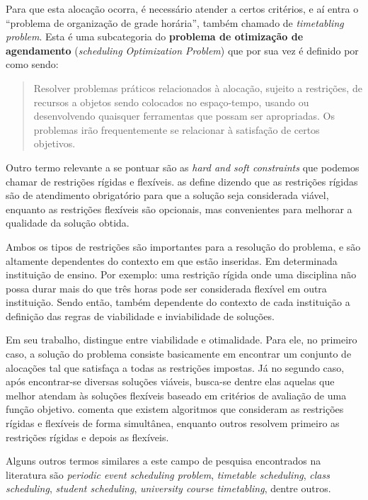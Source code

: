 Para que esta alocação ocorra, é necessário atender a certos critérios, e aí entra o ``problema de organização de grade horária'', também chamado de \textit{timetabling problem}. Esta é uma subcategoria do \textbf{problema de otimização de agendamento} (\textit{scheduling Optimization Problem}) \cite{Alencar2019} que por sua vez é definido por  como sendo:

\begin{quote}\footnotesize
  Resolver problemas práticos relacionados à alocação, sujeito a restrições, de recursos a objetos sendo colocados no espaço-tempo, usando ou desenvolvendo quaisquer ferramentas que possam ser apropriadas. Os problemas irão frequentemente se relacionar à satisfação de certos objetivos. \cite{Wren1996}
\end{quote}

Outro termo relevante a se pontuar são as \textit{hard and soft constraints} que podemos chamar de restrições rígidas e flexíveis.  as define dizendo que as restrições rígidas são de atendimento obrigatório para que a solução seja considerada viável, enquanto as restrições flexíveis são opcionais, mas convenientes para melhorar a qualidade da solução obtida.

Ambos os tipos de restrições são importantes para a resolução do problema, e são altamente dependentes do contexto em que estão inseridas. Em determinada instituição de ensino. Por exemplo: uma restrição rígida onde uma disciplina não possa durar mais do que três horas pode ser considerada flexível em outra instituição. Sendo então, também dependente do contexto de cada instituição a definição das regras de viabilidade e inviabilidade de soluções.

Em seu trabalho,  distingue entre viabilidade e otimalidade. Para ele, no primeiro caso, a solução do problema consiste basicamente em encontrar um conjunto de alocações tal que satisfaça a todas as restrições impostas. Já no segundo caso, após encontrar-se diversas soluções viáveis, busca-se dentre elas aquelas que melhor atendam às soluções flexíveis baseado em critérios de avaliação de uma função objetivo.  comenta que existem algoritmos que consideram as restrições rígidas e flexíveis de forma simultânea, enquanto outros resolvem primeiro as restrições rígidas e depois as flexíveis.

Alguns outros termos similares a este campo de pesquisa encontrados na literatura são \textit{periodic event scheduling problem}, \textit{timetable scheduling}, \textit{class scheduling}, \textit{student scheduling}, \textit{university course timetabling}, dentre outros.

